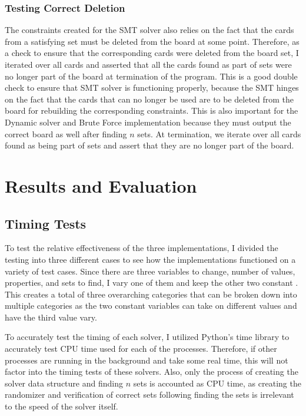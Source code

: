 \documentclass[pageno]{jpaper}
\begin{document}
\subsubsection{Testing Correct Deletion}

The constraints created for the SMT solver also relies on the fact that the cards from a satisfying set must be deleted from the board at some point. Therefore, as a check to ensure that the corresponding cards were deleted from the board set, I iterated over all cards and asserted that all the cards found as part of sets were no longer part of the board at termination of the program. This is a good double check to ensure that SMT solver is functioning properly, because the SMT hinges on the fact that the cards that can no longer be used are to be deleted from the board for rebuilding the corresponding constraints. This is also important for the Dynamic solver and Brute Force implementation because they must output the correct board as well after finding $n$ sets. At termination, we iterate over all cards found as being part of sets and assert that they are no longer part of the board.

\section{Results and Evaluation}



\subsection{Timing Tests}

To test the relative effectiveness of the three implementations, I divided the testing into three different cases to see how the implementations functioned on a variety of test cases. Since there are three variables to change, number of values, properties, and sets to find, I vary one of them and keep the other two constant . This creates a total of three overarching categories that can be broken down into multiple categories as the two constant variables can take on different values and have the third value vary. 

To accurately test the timing of each solver, I utilized Python's time library to accurately test CPU time used for each of the processes. Therefore, if other processes are running in the background and take some real time, this will not factor into the timing tests of these solvers. Also, only the process of creating the solver data structure and finding $n$ sets is accounted as CPU time, as creating the randomizer and verification of correct sets following finding the sets is irrelevant to the speed of the solver itself. 
\end{document}
